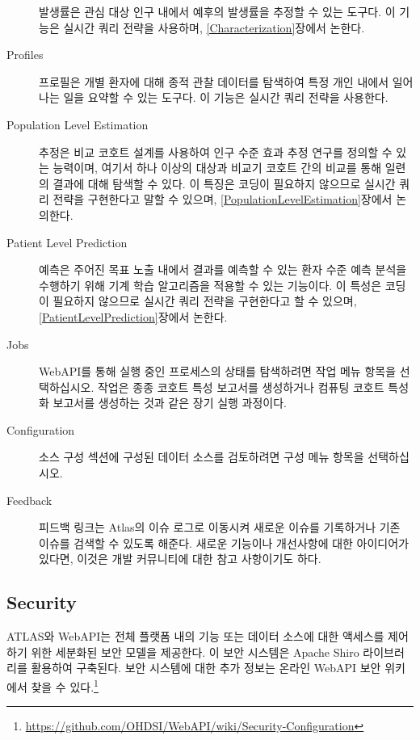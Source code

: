 \documentclass[11pt]{book}
\let\rmarkdownfootnote\footnote%
\def\footnote{\protect\rmarkdownfootnote}
\theoremstyle{definition}
\theoremstyle{definition}
\theoremstyle{definition}
\theoremstyle{remark}
\begin{document}
\begin{description}
발생률은 관심 대상 인구 내에서 예후의 발생률을 추정할 수 있는 도구다. 이
기능은 실시간 쿼리 전략을 사용하며, \ref{Characterization}장에서 논한다.
\item[Profiles \index{ATLAS!profiles}]
프로필은 개별 환자에 대해 종적 관찰 데이터를 탐색하여 특정 개인 내에서
일어나는 일을 요약할 수 있는 도구다. 이 기능은 실시간 쿼리 전략을
사용한다.
\item[Population Level Estimation
\index{ATLAS!population level estimation}]
추정은 비교 코호트 설계를 사용하여 인구 수준 효과 추정 연구를 정의할 수
있는 능력이며, 여기서 하나 이상의 대상과 비교기 코호트 간의 비교를 통해
일련의 결과에 대해 탐색할 수 있다. 이 특징은 코딩이 필요하지 않으므로
실시간 쿼리 전략을 구현한다고 말할 수 있으며,
\ref{PopulationLevelEstimation}장에서 논의한다.
\item[Patient Level Prediction \index{ATLAS!patient level prediction}]
예측은 주어진 목표 노출 내에서 결과를 예측할 수 있는 환자 수준 예측
분석을 수행하기 위해 기계 학습 알고리즘을 적용할 수 있는 기능이다. 이
특성은 코딩이 필요하지 않으므로 실시간 쿼리 전략을 구현한다고 할 수
있으며, \ref{PatientLevelPrediction}장에서 논한다.
\item[Jobs \index{ATLAS!jobs}]
WebAPI를 통해 실행 중인 프로세스의 상태를 탐색하려면 작업 메뉴 항목을
선택하십시오. 작업은 종종 코호트 특성 보고서를 생성하거나 컴퓨팅 코호트
특성화 보고서를 생성하는 것과 같은 장기 실행 과정이다.
\item[Configuration \index{ATLAS!configuration}]
소스 구성 섹션에 구성된 데이터 소스를 검토하려면 구성 메뉴 항목을
선택하십시오.
\item[Feedback \index{ATLAS!feedback}]
피드백 링크는 Atlas의 이슈 로그로 이동시켜 새로운 이슈를 기록하거나 기존
이슈를 검색할 수 있도록 해준다. 새로운 기능이나 개선사항에 대한
아이디어가 있다면, 이것은 개발 커뮤니티에 대한 참고 사항이기도 하다.
\end{description}

\subsection{Security}\label{security}

ATLAS와 WebAPI는 전체 플랫폼 내의 기능 또는 데이터 소스에 대한 액세스를
제어하기 위한 세분화된 보안 모델을 제공한다. 이 보안 시스템은 Apache
Shiro 라이브러리를 활용하여 구축된다. 보안 시스템에 대한 추가 정보는
온라인 WebAPI 보안 위키에서 찾을 수 있다.\footnote{\url{https://github.com/OHDSI/WebAPI/wiki/Security-Configuration}}
\end{document}
